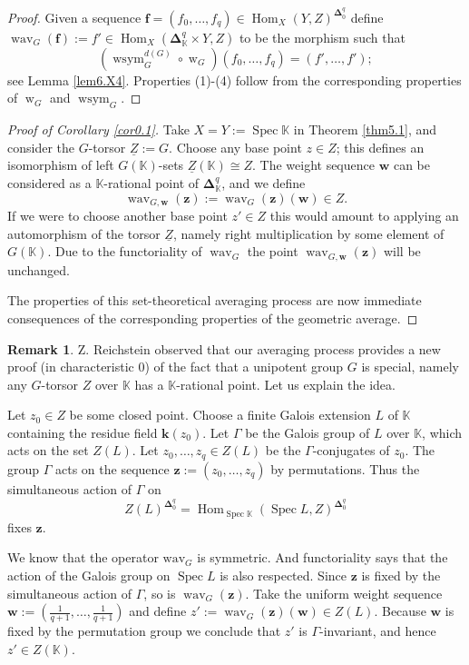\documentclass[10pt]{amsart}
\theoremstyle{definition}
\newtheorem{rem}[equation]{Remark}
\numberwithin{equation}{section}
\newcommand{\opn}{\operatorname}
\newcommand{\ul}{\underline}
\newcommand{\mrm}[1]{\mathrm{#1}}
\newcommand{\mbb}[1]{\mathbb{#1}}
\newcommand{\tup}[1]{\textup{#1}}
\newcommand{\bsym}[1]{\boldsymbol{#1}}
\newcommand{\K}{\mbb{K}}
\begin{document}
\begin{proof}
Given a sequence
$\bsym{f} = 
(f_0, \ldots, f_q) \in \opn{Hom}_X(Y, Z)^{\bsym{\Delta}^q_{0}}$
define 
$\opn{wav}_G(\bsym{f}) := f' \in  
\opn{Hom}_X(\bsym{\Delta}^q_{\K} \times Y, Z)$
to be the morphism such that
\[ (\opn{wsym}^{d(G)}_G \circ \opn{w}_G)(f_0, \ldots, f_q) = 
(f', \ldots, f') ; \]
see Lemma \ref{lem6.X4}. Properties (1)-(4) follow from the 
corresponding properties of $\opn{w}_G$ and $\opn{wsym}_G$.
\end{proof}

\begin{proof}[Proof of Corollary \tup{\ref{cor0.1}}]
Take $X = Y := \opn{Spec} \K$ in Theorem \ref{thm5.1}, and 
consider the $G$-torsor $\ul{Z} := G$. 
Choose any base point $z \in Z$;
this defines an isomorphism of left $G(\K)$-sets 
$\ul{Z}(\K) \cong Z$.
The weight sequence $\bsym{w}$ can be considered as a 
$\K$-rational point of $\bsym{\Delta}^q_{\K}$, and we define
\[ \opn{wav}_{G, \bsym{w}}(\bsym{z}) :=
\opn{wav}_{G}(\bsym{z})(\bsym{w}) \in Z . \]
If we were to choose another base point $z' \in Z$ this would 
amount to applying an automorphism of the torsor $\ul{Z}$,
namely right multiplication by some element of $G(\K)$. Due to the 
functoriality of $\opn{wav}_{G}$ the point  
$\opn{wav}_{G, \bsym{w}}(\bsym{z})$ will be unchanged.

The properties of this set-theoretical
averaging process are now immediate consequences of 
the corresponding properties of the geometric average. 
\end{proof}

\begin{rem} \label{rem1.1}
Z. Reichstein observed that our averaging process provides a new 
proof (in characteristic $0$)
of the fact that a unipotent group $G$ is special, namely 
any $G$-torsor $Z$ over $\K$ has a $\K$-rational point. Let us 
explain the idea. 

Let $z_0 \in Z$ be some closed point. Choose a finite Galois 
extension $L$ of $\K$ containing the residue field 
$\bsym{k}(z_0)$. Let $\Gamma$ be the Galois group of $L$ over 
$\K$, which acts on the set $Z(L)$.
Let $z_0, \ldots, z_q \in Z(L)$ 
be the $\Gamma$-conjugates of $z_0$. The group $\Gamma$ acts on 
the sequence 
$\bsym{z} := (z_0, \ldots, z_q)$ by permutations. 
Thus the simultaneous action of $\Gamma$ on 
\[ Z(L)^{\bsym{\Delta}^q_{0}} = 
\opn{Hom}_{\opn{Spec} \K}(\opn{Spec} L, Z)^{\bsym{\Delta}^q_{0}} \]
fixes $\bsym{z}$.

We know that the operator $\mrm{wav}_G$ is symmetric. 
And functoriality says that the action of the Galois group 
on $\opn{Spec} L$ is also respected. 
Since $\bsym{z}$ is fixed by the simultaneous action of
$\Gamma$, so is $\opn{wav}_G(\bsym{z})$. 
Take the uniform weight sequence 
$\bsym{w} := (\frac{1}{q+1}, \ldots, \frac{1}{q+1})$
and define
$z' := \opn{wav}_G(\bsym{z})(\bsym{w}) \in Z(L)$.
Because $\bsym{w}$ is fixed by the permutation group we conclude 
that $z'$ is $\Gamma$-invariant, and hence $z' \in Z(\K)$.
\end{rem}
\end{document}
